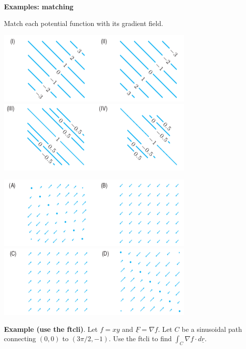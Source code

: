 \documentclass[12pt,letterpaper,noanswers]{exam}
\newcommand{\mb}[1]{\underline{#1}}
\begin{document}


\noindent\textbf{Examples: matching}

Match each potential function with its gradient field.  %

\includegraphics[width=0.45\linewidth]{img/C22p1a.png}
\includegraphics[width=0.45\linewidth]{img/C22p1b.png}

\includegraphics[width=0.45\linewidth]{img/C22p1c.png}
\includegraphics[width=0.45\linewidth]{img/C22p1d.png}
\vspace{1in}


\eject

\noindent\textbf{Example (use the ftcli)}.  Let $f = xy$ and $\mb F = \nabla f.$  Let $C$ be a sinusoidal path connecting $(0,0)$ to $(3\pi/2,-1)$.  Use the ftcli to find $\int_C \nabla f \cdot d\mb r$.


\vspace{1.2in}
\end{document}
